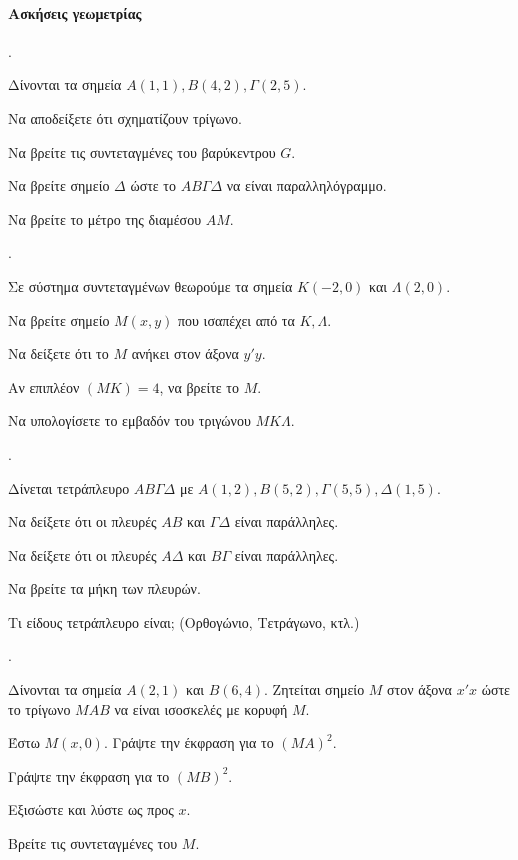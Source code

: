 \documentclass[11pt,a4paper,twocolumn]{article}
\newcounter{askhsh}
\newcommand{\askhsh}{\large\theaskhsh.\ \addtocounter{askhsh}{1}}
\begin{document}
\paragraph{Ασκήσεις γεωμετρίας}
\askhsh Δίνονται τα σημεία $A(1, 1), B(4, 2), \Gamma(2, 5)$.

\begin{alist}
    \item Να αποδείξετε ότι σχηματίζουν τρίγωνο.
    \item Να βρείτε τις συντεταγμένες του βαρύκεντρου $G$.
    \item Να βρείτε σημείο $\Delta$ ώστε το $AB\Gamma\Delta$ να είναι παραλληλόγραμμο.
    \item Να βρείτε το μέτρο της διαμέσου $AM$.
\end{alist}


\askhsh Σε σύστημα συντεταγμένων θεωρούμε τα σημεία $K(-2, 0)$ και $\Lambda(2, 0)$.

\begin{alist}
    \item Να βρείτε σημείο $M(x,y)$ που ισαπέχει από τα $K, \Lambda$.
    \item Να δείξετε ότι το $M$ ανήκει στον άξονα $y'y$.
    \item Αν επιπλέον $(MK)=4$, να βρείτε το $M$.
    \item Να υπολογίσετε το εμβαδόν του τριγώνου $MK\Lambda$.
\end{alist}


\askhsh Δίνεται τετράπλευρο $AB\Gamma\Delta$ με $A(1,2), B(5,2), \Gamma(5,5), \Delta(1,5)$.

\begin{alist}
    \item Να δείξετε ότι οι πλευρές $AB$ και $\Gamma\Delta$ είναι παράλληλες.
    \item Να δείξετε ότι οι πλευρές $A\Delta$ και $B\Gamma$ είναι παράλληλες.
    \item Να βρείτε τα μήκη των πλευρών.
    \item Τι είδους τετράπλευρο είναι; (Ορθογώνιο, Τετράγωνο, κτλ.)
\end{alist}


\askhsh Δίνονται τα σημεία $A(2, 1)$ και $B(6, 4)$. Ζητείται σημείο $M$ στον άξονα $x'x$ ώστε το τρίγωνο $MAB$ να είναι ισοσκελές με κορυφή $M$.

\begin{alist}
    \item Έστω $M(x, 0)$. Γράψτε την έκφραση για το $(MA)^2$.
    \item Γράψτε την έκφραση για το $(MB)^2$.
    \item Εξισώστε και λύστε ως προς $x$.
    \item Βρείτε τις συντεταγμένες του $M$.
\end{alist}
\end{document}
